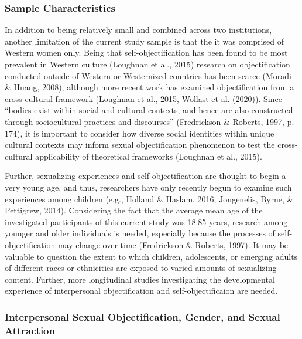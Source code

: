 \documentclass[man]{apa6}
\begin{document}
\subsubsection{Sample Characteristics}\label{sample-characteristics}

In addition to being relatively small and combined across two
institutions, another limitation of the current study sample is that the
it was comprised of Western women only. Being that self-objectification
has been found to be most prevalent in Western culture (Loughnan et al.,
2015) research on objectification conducted outside of Western or
Westernized countries has been scarce (Moradi \& Huang, 2008), although
more recent work has examined objectification from a cross-cultural
framework (Loughnan et al., 2015, Wollast et al. (2020)). Since
\enquote{bodies exist within social and cultural contexts, and hence are
also constructed through sociocultural practices and discourses}
(Fredrickson \& Roberts, 1997, p. 174), it is important to consider how
diverse social identities within unique cultural contexts may inform
sexual objectification phenomenon to test the cross-cultural
applicability of theoretical frameworks (Loughnan et al., 2015).

Further, sexualizing experiences and self-objectification are thought to
begin a very young age, and thus, researchers have only recently begun
to examine such experiences among children (e.g., Holland \& Haslam,
2016; Jongenelis, Byrne, \& Pettigrew, 2014). Considering the fact that
the average mean age of the investigated participants of this current
study was 18.85 years, research among younger and older individuals is
needed, especially because the processes of self-objectification may
change over time (Fredrickson \& Roberts, 1997). It may be valuable to
question the extent to which children, adolescents, or emerging adults
of different races or ethnicities are exposed to varied amounts of
sexualizing content. Further, more longitudinal studies investigating
the developmental experience of interpersonal objectification and
self-objectificaion are needed.

\subsubsection{Interpersonal Sexual Objectification, Gender, and Sexual
Attraction}\label{interpersonal-sexual-objectification-gender-and-sexual-attraction}
\end{document}
